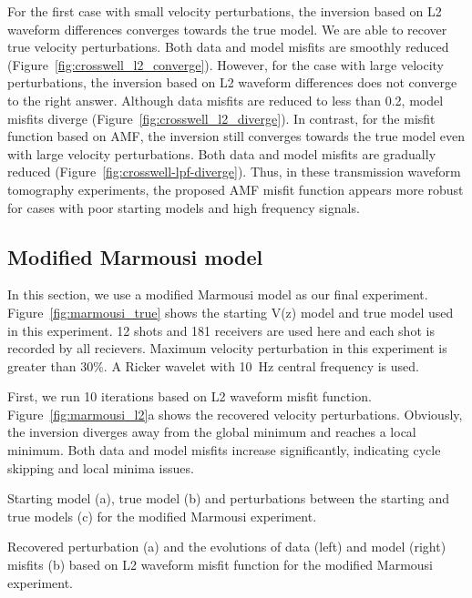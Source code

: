 For the first case with small velocity perturbations, the inversion based on L2 waveform 
differences converges towards the true model. We are able to recover true velocity 
perturbations. Both data and model misfits are smoothly reduced (Figure~\ref{fig:crosswell_l2_converge}). 
However, for the case 
with large velocity perturbations, the inversion based on L2 waveform differences does not converge to the right answer. 
Although data misfits are reduced to less than 0.2, model 
misfits diverge (Figure~\ref{fig:crosswell_l2_diverge}). 
In contrast, for the misfit function based on AMF, the 
inversion still converges towards the true model even with large velocity perturbations. 
Both data and model misfits are gradually reduced (Figure~\ref{fig:crosswell-lpf-diverge}). 
Thus, in these transmission waveform tomography experiments, 
the proposed AMF misfit function appears more robust for cases with poor starting models 
and high frequency signals. 

\subsection{Modified Marmousi model}
In this section, we use a modified Marmousi model as our final experiment. 
Figure~\ref{fig:marmousi_true} shows the starting V(z) model and true model used in this 
experiment. 12 shots and 181 
receivers are used here and each shot is recorded by all recievers. 
Maximum velocity perturbation
in this experiment is greater than 30\%. A Ricker wavelet with 10~Hz central frequency is used.

First, we run 10 iterations based on  L2 waveform misfit function. 
Figure~\ref{fig:marmousi_l2}a shows the recovered velocity
perturbations. Obviously, the inversion diverges away from the global minimum and reaches a local minimum. Both data and
model misfits increase significantly, indicating cycle skipping and local minima issues.

{\label{fig:marmousi_true} 
Starting model (a), true model (b) and perturbations between 
the starting and true models (c) for the modified Marmousi experiment.}

{\label{fig:marmousi_l2} 
Recovered perturbation (a) and the evolutions of data (left) and model (right) misfits (b) 
based on L2 waveform misfit function for the modified Marmousi experiment.}

